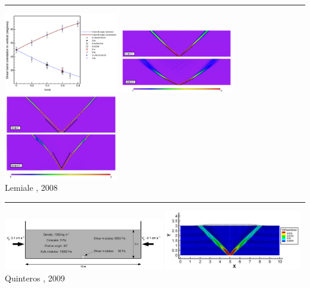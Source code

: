 \begin{center}\noindent\rule{12cm}{0.4pt}\end{center}

\begin{center}
\includegraphics[width=5cm]{images/benchmark_brick/lemm08a}
\includegraphics[width=5cm]{images/benchmark_brick/lemm08b}
\includegraphics[width=5cm]{images/benchmark_brick/lemm08c}\\
{\captionfont Lemiale \etal, 2008 \cite{lemm08}}
\end{center}

\begin{center}\noindent\rule{12cm}{0.4pt}\end{center}

\begin{center}
\includegraphics[width=7cm]{images/benchmark_brick/qurj09b}
\includegraphics[width=6cm]{images/benchmark_brick/qurj09a}\\
{\captionfont Quinteros \etal, 2009 \cite{qurj09}}
\end{center}

